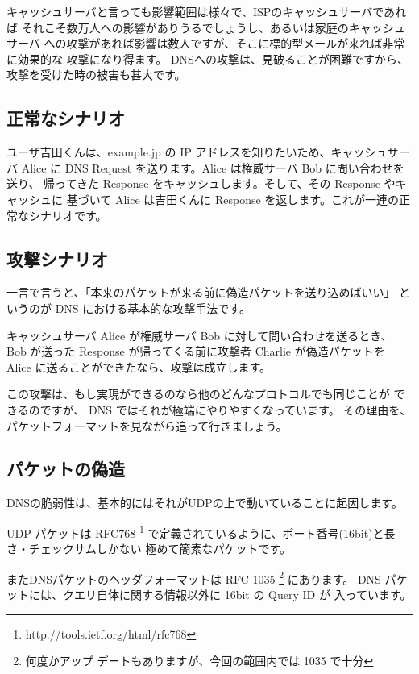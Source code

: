 キャッシュサーバと言っても影響範囲は様々で、ISPのキャッシュサーバであれば
それこそ数万人への影響がありうるでしょうし、あるいは家庭のキャッシュサーバ
への攻撃があれば影響は数人ですが、そこに標的型メールが来れば非常に効果的な
攻撃になり得ます。
DNSへの攻撃は、見破ることが困難ですから、攻撃を受けた時の被害も甚大です。

\subsection{正常なシナリオ}
ユーザ吉田くんは、example.jp の IP アドレスを知りたいため、キャッシュサーバ
Alice に DNS Request を送ります。Alice は権威サーバ Bob に問い合わせを送り、
帰ってきた Response をキャッシュします。そして、その Response やキャッシュに
基づいて Alice は吉田くんに Response を返します。これが一連の正常なシナリオです。

\subsection{攻撃シナリオ}
一言で言うと、「本来のパケットが来る前に偽造パケットを送り込めばいい」
というのが DNS における基本的な攻撃手法です。

キャッシュサーバ Alice が権威サーバ Bob に対して問い合わせを送るとき、
Bob が送った Response が帰ってくる前に攻撃者 Charlie が偽造パケットを
Alice に送ることができたなら、攻撃は成立します。

この攻撃は、もし実現ができるのなら他のどんなプロトコルでも同じことが
できるのですが、 DNS ではそれが極端にやりやすくなっています。
その理由を、パケットフォーマットを見ながら追って行きましょう。

\subsection{パケットの偽造}
DNSの脆弱性は、基本的にはそれがUDPの上で動いていることに起因します。


UDP パケットは RFC768 \footnote{http://tools.ietf.org/html/rfc768}
で定義されているように、ポート番号(16bit)と長さ・チェックサムしかない
極めて簡素なパケットです。


またDNSパケットのヘッダフォーマットは RFC 1035 \footnote{何度かアップ
デートもありますが、今回の範囲内では 1035 で十分} にあります。
DNS パケットには、クエリ自体に関する情報以外に 16bit の Query ID が
入っています。

